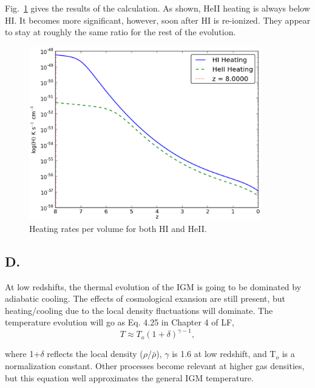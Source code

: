 \documentclass[a4paper]{article}
\begin{document}
Fig.~\ref{fig:heating} gives the results of the calculation. As shown, HeII
heating is always below HI. It becomes more significant, however, soon after
HI is re-ionized. They appear to stay at roughly the same ratio for the rest
of the evolution.
\begin{figure}
\centering
\includegraphics[width=0.9\textwidth]{./../../IGM/HI_HeII_heating.eps}
\caption{Heating rates per volume for both HI and HeII.}
\label{fig:heating}
\end{figure}

\subsection{D.}
At low redshifts, the thermal evolution of the IGM is going to be dominated by
adiabatic cooling. The effects of cosmological exansion are still present,
but heating/cooling due to the local density fluctuations will dominate. The 
temperature evolution will go as Eq. 4.25 in Chapter 4 of LF,
\begin{equation}
T \approx T_{o}(1+\delta)^{\gamma-1},
\end{equation}

where 1+$\delta$ reflects the local density ($\rho$/$\bar{\rho}$), $\gamma$ is
1.6 at low redshift, and T$_{o}$ is a normalization constant. Other processes
become relevant at higher gas densities, but this equation well approximates
the general IGM temperature.
\end{document}
